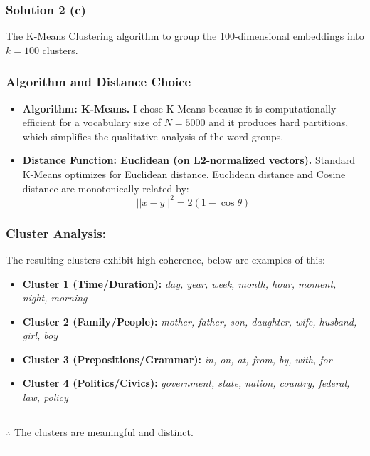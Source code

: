 \documentclass{article}
\begin{document}
\subsubsection*{Solution 2 (c)}

The K-Means Clustering algorithm to group the 100-dimensional embeddings into $k=100$ clusters. 

\subsubsection*{Algorithm and Distance Choice}
\begin{itemize}
    \item \textbf{Algorithm: K-Means.} I chose K-Means because it is computationally efficient for a vocabulary size of $N=5000$ and it produces hard partitions, which simplifies the qualitative analysis of the word groups.
    \item \textbf{Distance Function: Euclidean (on L2-normalized vectors).} Standard K-Means optimizes for Euclidean distance. Euclidean distance and Cosine distance are monotonically related by:
    $$||x-y||^2 = 2(1 - \cos\theta)$$
\end{itemize}

\subsubsection*{Cluster Analysis:}
The resulting clusters exhibit high coherence, below are examples of this:

\begin{itemize}
    \item \textbf{Cluster 1 (Time/Duration):} \textit{day, year, week, month, hour, moment, night, morning}
    \item \textbf{Cluster 2 (Family/People):} \textit{mother, father, son, daughter, wife, husband, girl, boy}
    \item \textbf{Cluster 3 (Prepositions/Grammar):} \textit{in, on, at, from, by, with, for}
    \item \textbf{Cluster 4 (Politics/Civics):} \textit{government, state, nation, country, federal, law, policy}
\end{itemize}

\subsection*{\normalfont}{$\therefore$ The clusters are meaningful and distinct.}
\noindent\rule{\textwidth}{0.4pt}\\
\end{document}
